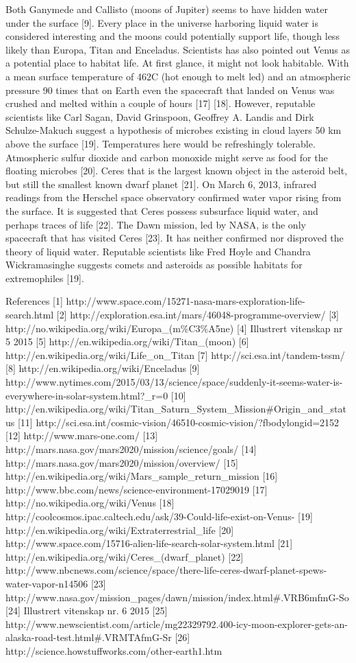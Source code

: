 Both Ganymede and Callisto (moons of Jupiter) seems to have hidden water under the surface [9].
Every place in the universe harboring liquid water is considered interesting and the moons could potentially support life, though less likely than Europa, Titan and Enceladus.
Scientists has also pointed out Venus as a potential place to habitat life.
At first glance, it might not look habitable.
With a mean surface temperature of 462\degree C (hot enough to melt led) and an atmospheric pressure 90 times that on Earth even the spacecraft that landed on Venus was crushed and melted within a couple of hours [17] [18].
However, reputable scientists like Carl Sagan, David Grinspoon, Geoffrey A. Landis and Dirk Schulze-Makuch suggest a hypothesis of microbes existing in cloud layers 50 km above the surface [19].
Temperatures here would be refreshingly tolerable.
Atmospheric sulfur dioxide and carbon monoxide might serve as food for the floating microbes [20].
Ceres that is the largest known object in the asteroid belt, but still the smallest known dwarf planet [21].
On March 6, 2013, infrared readings from the Herschel space observatory confirmed water vapor rising from the surface. It is suggested that Ceres possess subsurface liquid water, and perhaps traces of life [22].
The Dawn mission, led by NASA, is the only spacecraft that has visited Ceres [23].
It has neither confirmed nor disproved the theory of liquid water.
Reputable scientists like Fred Hoyle and Chandra Wickramasinghe suggests comets and asteroids as possible habitats for extremophiles [19].
 
References
[1]	http://www.space.com/15271-nasa-mars-exploration-life-search.html
[2]	http://exploration.esa.int/mars/46048-programme-overview/
[3]	http://no.wikipedia.org/wiki/Europa_(m\%C3\%A5ne)
[4]	Illustrert vitenskap nr 5 2015
[5]	http://en.wikipedia.org/wiki/Titan_(moon)
[6]	http://en.wikipedia.org/wiki/Life_on_Titan
[7]	http://sci.esa.int/tandem-tssm/
[8]	http://en.wikipedia.org/wiki/Enceladus
[9]	http://www.nytimes.com/2015/03/13/science/space/suddenly-it-seems-water-is-everywhere-in-solar-system.html?_r=0
[10]	http://en.wikipedia.org/wiki/Titan_Saturn_System_Mission#Origin_and_status
[11]	http://sci.esa.int/cosmic-vision/46510-cosmic-vision/?fbodylongid=2152
[12]	http://www.mars-one.com/
[13]	http://mars.nasa.gov/mars2020/mission/science/goals/
[14]	http://mars.nasa.gov/mars2020/mission/overview/
[15]	http://en.wikipedia.org/wiki/Mars_sample_return_mission
[16]	http://www.bbc.com/news/science-environment-17029019
[17]	http://no.wikipedia.org/wiki/Venus
[18]	http://coolcosmos.ipac.caltech.edu/ask/39-Could-life-exist-on-Venus-
[19]	http://en.wikipedia.org/wiki/Extraterrestrial_life
[20]	http://www.space.com/15716-alien-life-search-solar-system.html
[21]	http://en.wikipedia.org/wiki/Ceres_(dwarf_planet)
[22]	http://www.nbcnews.com/science/space/there-life-ceres-dwarf-planet-spews-water-vapor-n14506
[23]	http://www.nasa.gov/mission_pages/dawn/mission/index.html#.VRB6mfmG-So
[24]	Illustrert vitenskap nr. 6 2015
[25]	http://www.newscientist.com/article/mg22329792.400-icy-moon-explorer-gets-an-alaska-road-test.html#.VRMTAfmG-Sr
[26]	http://science.howstuffworks.com/other-earth1.htm
